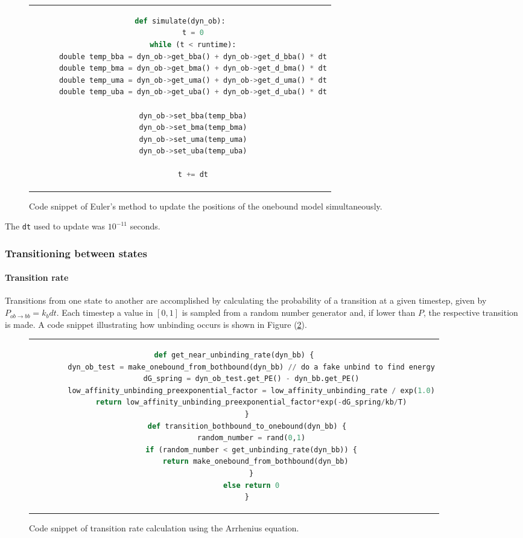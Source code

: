 \documentclass[10pt]{article} %
\begin{document}
\begin{figure}[h!]
  \centering
  \begin{tabular}{c}
    \begin{lstlisting}[language=python]
      def simulate(dyn_ob):
      t = 0
      while (t < runtime):
      double temp_bba = dyn_ob->get_bba() + dyn_ob->get_d_bba() * dt
      double temp_bma = dyn_ob->get_bma() + dyn_ob->get_d_bma() * dt
      double temp_uma = dyn_ob->get_uma() + dyn_ob->get_d_uma() * dt
      double temp_uba = dyn_ob->get_uba() + dyn_ob->get_d_uba() * dt

      dyn_ob->set_bba(temp_bba)
      dyn_ob->set_bma(temp_bma)
      dyn_ob->set_uma(temp_uma)
      dyn_ob->set_uba(temp_uba)

      t += dt
    \end{lstlisting}
  \end{tabular}
  \caption{Code snippet of Euler's method to update the positions of the onebound model simultaneously.}
  \label{ob_struct}
\end{figure}

The \verb|dt| used to update was $10^{-11}$ seconds.

\subsubsection{Transitioning between states}

\paragraph{Transition rate}
\label{sec:transitioning-states}
Transitions from one state to another are accomplished by calculating the probability of a transition at a given timestep, given by $P_{ob\rightarrow bb} = k_bdt$. Each timestep a value in $[0,1]$ is sampled from a random number generator and, if lower than $P$, the respective transition is made. A code snippet illustrating how unbinding occurs is shown in Figure (\ref{transition-rate-snippet}).

\begin{figure}[h!]
  \begin{tabular}{c}
    \begin{lstlisting}[language=python]
      def get_near_unbinding_rate(dyn_bb) {
        dyn_ob_test = make_onebound_from_bothbound(dyn_bb) // do a fake unbind to find energy
        dG_spring = dyn_ob_test.get_PE() - dyn_bb.get_PE()
        low_affinity_unbinding_preexponential_factor = low_affinity_unbinding_rate / exp(1.0)
        return low_affinity_unbinding_preexponential_factor*exp(-dG_spring/kb/T)
      }
      def transition_bothbound_to_onebound(dyn_bb) {
        random_number = rand(0,1)
        if (random_number < get_unbinding_rate(dyn_bb)) {
          return make_onebound_from_bothbound(dyn_bb)
        }
        else return 0
      }
    \end{lstlisting}
  \end{tabular}
  \caption{Code snippet of transition rate calculation using the Arrhenius equation.}
  \label{transition-rate-snippet}
\end{figure}
\end{document}
